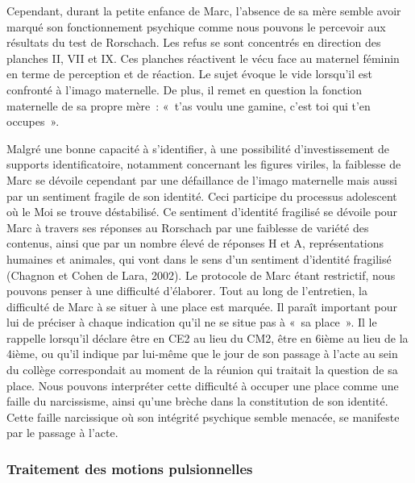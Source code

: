 \documentclass[12pt, a4paper]{book}
\begin{document}
\begin{spacing}{1.5}
 Cependant, durant la petite enfance de Marc, l'absence de sa mère semble avoir marqué son fonctionnement psychique comme nous pouvons le percevoir aux résultats du test de Rorschach. Les refus se sont concentrés en direction des planches II, VII et IX. Ces planches réactivent le vécu face au maternel féminin en terme de perception et de réaction. Le sujet évoque le vide lorsqu'il est confronté à l'imago maternelle. De plus, il remet en question la fonction maternelle de sa propre mère : « t'as voulu une gamine, c'est toi qui t'en occupes ».

Malgré une bonne capacité à s'identifier, à une possibilité d'investissement de supports identificatoire, notamment concernant les figures viriles, la faiblesse de Marc se dévoile cependant par une défaillance de l'imago maternelle mais aussi par un sentiment fragile de son identité. Ceci participe du processus adolescent où le Moi se trouve déstabilisé. Ce sentiment d'identité fragilisé se dévoile pour Marc à travers ses réponses au Rorschach par une faiblesse de variété des contenus, ainsi que par un nombre élevé de réponses H et A, représentations humaines et animales, qui vont dans le sens d'un sentiment d'identité fragilisé (Chagnon et Cohen de Lara, 2002). Le protocole de Marc étant restrictif, nous pouvons penser à une difficulté d'élaborer. Tout au long de l'entretien,  la difficulté de Marc à se situer à une place est marquée. Il paraît important pour lui de préciser à chaque indication qu'il ne se situe pas à « sa place ». Il le rappelle lorsqu'il déclare être en CE2 au lieu du CM2, être en 6ième au lieu de la 4ième, ou qu'il indique par lui-même que le jour de son passage à l'acte au sein du collège correspondait au moment de la réunion qui traitait la question de sa place. Nous pouvons interpréter cette difficulté à occuper une place comme une faille du narcissisme, ainsi qu'une brèche dans la constitution de son identité. Cette faille narcissique où son intégrité psychique semble menacée, se manifeste par le passage à l'acte.

\subsubsection{Traitement des motions pulsionnelles}


\end{spacing}
\end{document}
